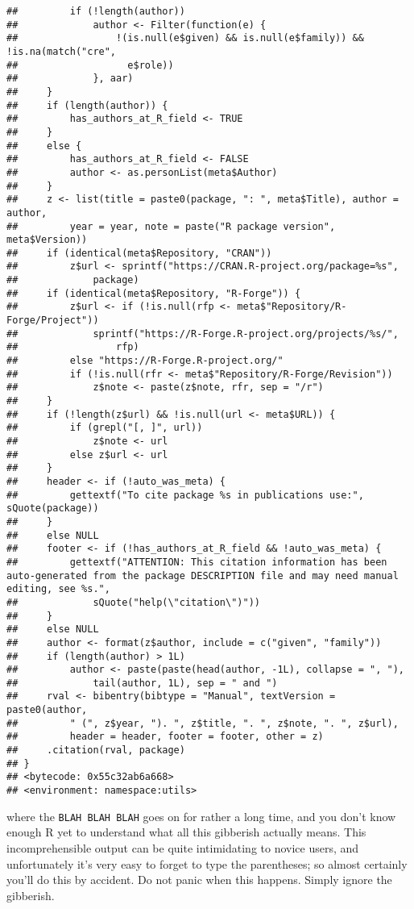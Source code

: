\documentclass[]{book}
\begin{document}
\begin{verbatim}
##         if (!length(author)) 
##             author <- Filter(function(e) {
##                 !(is.null(e$given) && is.null(e$family)) && !is.na(match("cre", 
##                   e$role))
##             }, aar)
##     }
##     if (length(author)) {
##         has_authors_at_R_field <- TRUE
##     }
##     else {
##         has_authors_at_R_field <- FALSE
##         author <- as.personList(meta$Author)
##     }
##     z <- list(title = paste0(package, ": ", meta$Title), author = author, 
##         year = year, note = paste("R package version", meta$Version))
##     if (identical(meta$Repository, "CRAN")) 
##         z$url <- sprintf("https://CRAN.R-project.org/package=%s", 
##             package)
##     if (identical(meta$Repository, "R-Forge")) {
##         z$url <- if (!is.null(rfp <- meta$"Repository/R-Forge/Project")) 
##             sprintf("https://R-Forge.R-project.org/projects/%s/", 
##                 rfp)
##         else "https://R-Forge.R-project.org/"
##         if (!is.null(rfr <- meta$"Repository/R-Forge/Revision")) 
##             z$note <- paste(z$note, rfr, sep = "/r")
##     }
##     if (!length(z$url) && !is.null(url <- meta$URL)) {
##         if (grepl("[, ]", url)) 
##             z$note <- url
##         else z$url <- url
##     }
##     header <- if (!auto_was_meta) {
##         gettextf("To cite package %s in publications use:", sQuote(package))
##     }
##     else NULL
##     footer <- if (!has_authors_at_R_field && !auto_was_meta) {
##         gettextf("ATTENTION: This citation information has been auto-generated from the package DESCRIPTION file and may need manual editing, see %s.", 
##             sQuote("help(\"citation\")"))
##     }
##     else NULL
##     author <- format(z$author, include = c("given", "family"))
##     if (length(author) > 1L) 
##         author <- paste(paste(head(author, -1L), collapse = ", "), 
##             tail(author, 1L), sep = " and ")
##     rval <- bibentry(bibtype = "Manual", textVersion = paste0(author, 
##         " (", z$year, "). ", z$title, ". ", z$note, ". ", z$url), 
##         header = header, footer = footer, other = z)
##     .citation(rval, package)
## }
## <bytecode: 0x55c32ab6a668>
## <environment: namespace:utils>
\end{verbatim}

where the \texttt{BLAH\ BLAH\ BLAH} goes on for rather a long time, and you don't know enough R yet to understand what all this gibberish actually means. This incomprehensible output can be quite intimidating to novice users, and unfortunately it's very easy to forget to type the parentheses; so almost certainly you'll do this by accident. Do not panic when this happens. Simply ignore the gibberish.
\end{document}
